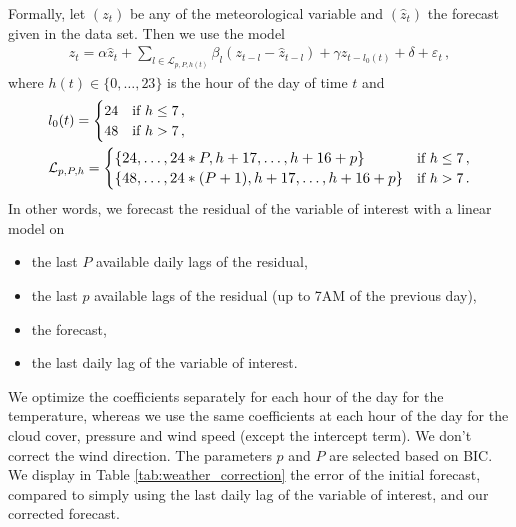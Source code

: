 \documentclass[transmag]{IEEEtran}
\begin{document}
Formally, let $(z_t)$ be any of the meteorological variable and $(\hat z_t)$ the forecast given in the data set. Then we use the model
\begin{align*}
    z_t = \alpha \hat z_t + \sum\limits_{l\in \mathcal{L}_{p,P,h(t)}} \beta_l (z_{t-l} - \hat z_{t-l}) + \gamma z_{t-l_0(t)} +\delta + \varepsilon_t \,,
\end{align*}
where $h(t)\in\{0,\hdots,23\}$ is the hour of the day of time $t$ and
\begin{align*}
    & l_0(t) = 
    \begin{cases}
    24 & \text{if } h\le 7\,, \\
    48 & \text{if } h>7\,,
    \end{cases} \\
    & \mathcal{L}_{p,P,h} = 
    \begin{cases}
    \resizebox{0.52\hsize}{!}{$\{24,\hdots,24*P,h+17,\hdots,h+16+p\}$} & \text{if } h\le 7\,, \\
    \resizebox{0.6\hsize}{!}{$\{48,\hdots,24*(P+1),h+17,\hdots,h+16+p\}$} & \text{if } h>7\,.
    \end{cases}
\end{align*}
In other words, we forecast the residual of the variable of interest with a linear model on
\begin{itemize}
    \item 
    the last $P$ available daily lags of the residual,
    \item
    the last $p$ available lags of the residual (up to 7AM of the previous day),
    \item
    the forecast,
    \item
    the last daily lag of the variable of interest.
\end{itemize}

We optimize the coefficients separately for each hour of the day for the temperature, whereas we use the same coefficients at each hour of the day for the cloud cover, pressure and wind speed (except the intercept term). We don't correct the wind direction. The parameters $p$ and $P$ are selected based on BIC. We display in Table \ref{tab:weather_correction} the error of the initial forecast, compared to simply using the last daily lag of the variable of interest, and our corrected forecast.
\end{document}
